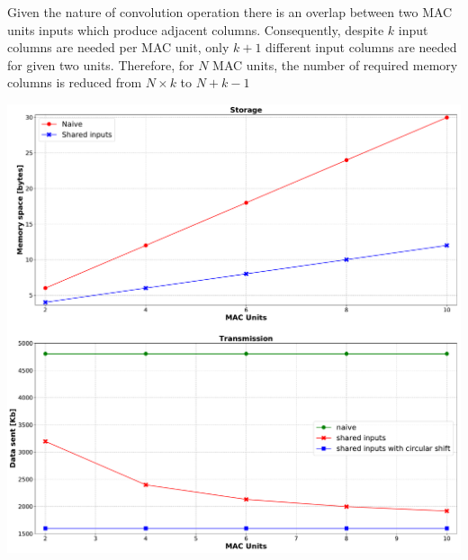 \documentclass[a1paper,portrait,fontscale=0.43]{baposter}
\begin{document}
\begin{poster}
{\begin{multicols}{2}
  Given the nature of convolution operation there is an
  overlap between two MAC units inputs which produce adjacent columns. Consequently, despite $k$ input columns are needed per MAC unit, only $k+1$
  different input columns are needed for given two units. 
  Therefore, for $N$ MAC units, the number of required memory columns is reduced from $N \times k$ to $N+k-1$ 
  \setcounter{figure}{2}
  \begin{center}
  \hfill \break
  \includegraphics[width=\linewidth]{datas_mems}
  \label{dflow}
  \end{center}
  \vfill\null
  \columnbreak


\end{multicols}}
\end{poster}
\end{document}
